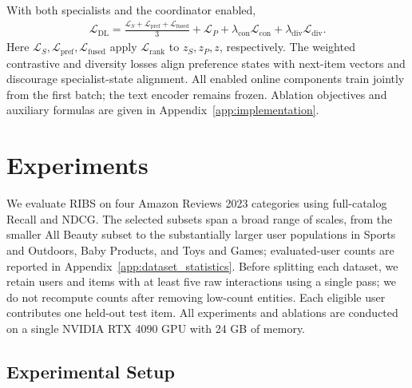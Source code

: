 ﻿\documentclass[sigconf,anonymous,review]{acmart}
\begin{document}
With both specialists and the coordinator enabled,
\begin{align}
 \mathcal L_{\mathrm{DL}}=\frac{\mathcal L_S+\mathcal L_{\mathrm{pref}}+\mathcal L_{\mathrm{fused}}}{3}
 +\mathcal L_P +\lambda_{\mathrm{con}}\mathcal L_{\mathrm{con}}
 +\lambda_{\mathrm{div}}\mathcal L_{\mathrm{div}}.
 \label{eq:single_stage_loss}
\end{align}
Here $\mathcal L_S,\mathcal L_{\mathrm{pref}},\mathcal L_{\mathrm{fused}}$ apply $\mathcal L_{\mathrm{rank}}$ to $z_S,z_P,z$, respectively. The weighted contrastive and diversity losses align preference states with next-item vectors and discourage specialist-state alignment. All enabled online components train jointly from the first batch; the text encoder remains frozen. Ablation objectives and auxiliary formulas are given in Appendix~\ref{app:implementation}.

\section{Experiments}

\label{sec:experiments}

We evaluate RIBS on four Amazon Reviews 2023 \cite{Amazon_2023} categories using full-catalog Recall and NDCG. The selected subsets span a broad range of scales, from the smaller All Beauty subset to the substantially larger user populations in Sports and Outdoors, Baby Products, and Toys and Games; evaluated-user counts are reported in Appendix~\ref{app:dataset_statistics}. Before splitting each dataset, we retain users and items with at least five raw interactions using a single pass; we do not recompute counts after removing low-count entities. Each eligible user contributes one held-out test item. All experiments and ablations are conducted on a single NVIDIA RTX 4090 GPU with 24 GB of memory.

\subsection{Experimental Setup}
\end{document}
